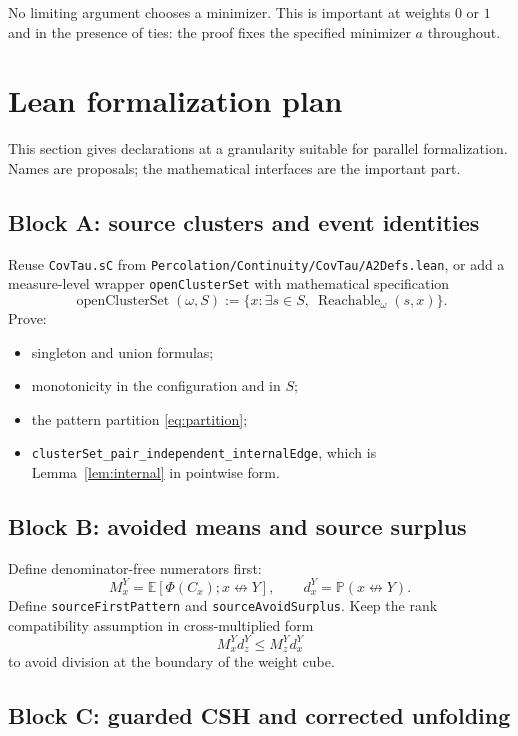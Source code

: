 \documentclass[11pt]{article}
\theoremstyle{definition}
\theoremstyle{remark}
\newcommand{\PP}{\mathbb P}
\newcommand{\EE}{\mathbb E}
\newcommand{\ncon}{\not\leftrightarrow}
\newcommand{\lean}[1]{\texttt{#1}}
\begin{document}
No limiting argument chooses a minimizer.  This is important at weights
$0$ or $1$ and in the presence of ties: the proof fixes the specified
minimizer $a$ throughout.

\section{Lean formalization plan}\label{sec:lean}

This section gives declarations at a granularity suitable for parallel
formalization.  Names are proposals; the mathematical interfaces are the
important part.

\subsection*{Block A: source clusters and event identities}

Reuse \lean{CovTau.sC} from
\lean{Percolation/Continuity/CovTau/A2Defs.lean}, or add a measure-level
wrapper \lean{openClusterSet} with mathematical specification
\[
 \operatorname{openClusterSet}(\omega,S)
 :=\{x:\exists s\in S,\ \operatorname{Reachable}_{\omega}(s,x)\}.
\]
Prove:
\begin{itemize}
\item singleton and union formulas;
\item monotonicity in the configuration and in $S$;
\item the pattern partition \eqref{eq:partition};
\item \lean{clusterSet\_pair\_independent\_internalEdge}, which is
  Lemma~\ref{lem:internal} in pointwise form.
\end{itemize}

\subsection*{Block B: avoided means and source surplus}

Define denominator-free numerators first:
\[
 M_x^Y=\EE[\Phi(C_x);x\ncon Y],\qquad d_x^Y=\PP(x\ncon Y).
\]
Define \lean{sourceFirstPattern} and \lean{sourceAvoidSurplus}.  Keep the
rank compatibility assumption in cross-multiplied form
\[
 M_x^Y d_z^Y\leq M_z^Y d_x^Y
\]
to avoid division at the boundary of the weight cube.

\subsection*{Block C: guarded CSH and corrected unfolding}
\end{document}
